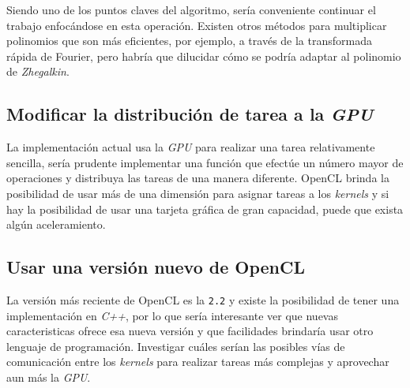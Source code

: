 Siendo uno de los puntos claves del algoritmo, sería conveniente continuar el trabajo enfocándose en esta operación. Existen otros métodos para multiplicar polinomios que son más eficientes, por ejemplo, a través de la transformada rápida de Fourier, pero habría que dilucidar cómo se podría adaptar al polinomio de \textit{Zhegalkin}.

\subsection{Modificar la distribución de tarea a la \textit{GPU}}

La implementación actual usa la \textit{GPU} para realizar una tarea relativamente sencilla, sería prudente implementar una función que efectúe un número mayor de operaciones y distribuya las tareas de una manera diferente. OpenCL brinda la posibilidad de usar más de una dimensión para asignar tareas a los \textit{kernels} y si hay la posibilidad de usar una tarjeta gráfica de gran capacidad, puede que exista algún aceleramiento.

\subsection{Usar una versión nuevo de OpenCL}

La versión más reciente de OpenCL es la \texttt{2.2} y existe la posibilidad de tener una implementación en \textit{C++}, por lo que sería interesante ver que nuevas caracteristicas ofrece esa nueva versión y que facilidades brindaría usar otro lenguaje de programación. Investigar cuáles serían las posibles vías de comunicación entre los \textit{kernels} para realizar tareas más complejas y aprovechar aun más la \textit{GPU}.